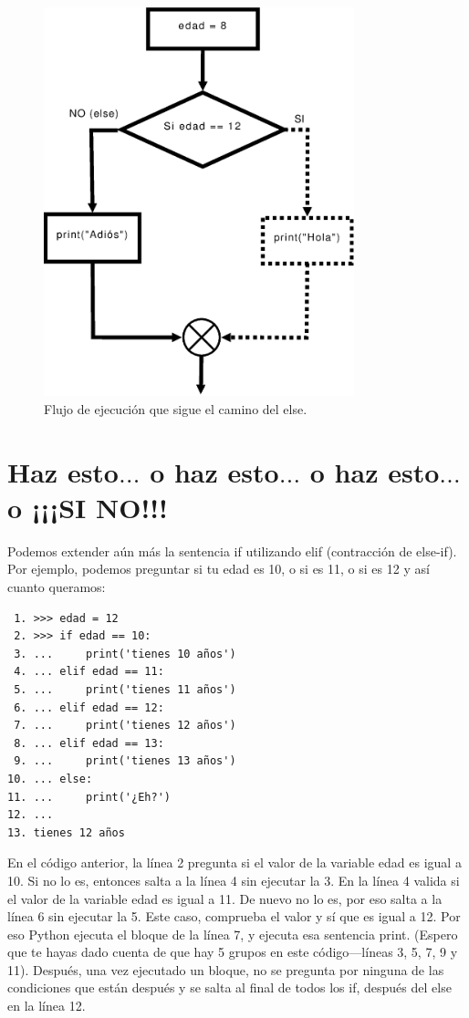 \begin{figure}
\begin{center}
\includegraphics[width=90mm]{if6.eps}
\end{center}
\caption{Flujo de ejecución que sigue el camino del else.}\label{if6}
\end{figure}

\section{Haz esto$\ldots$ o haz esto$\ldots$ o haz esto$\ldots$ o ¡¡¡SI NO!!!}

Podemos extender aún más la sentencia if utilizando elif (contracción de else-if).  Por ejemplo, podemos preguntar si tu edad es 10, o si es 11, o si es 12 y así cuanto queramos: 

\begin{listing}
\begin{verbatim}
 1. >>> edad = 12
 2. >>> if edad == 10:
 3. ...     print('tienes 10 años')
 4. ... elif edad == 11:
 5. ...     print('tienes 11 años')
 6. ... elif edad == 12:
 7. ...     print('tienes 12 años')
 8. ... elif edad == 13:
 9. ...     print('tienes 13 años')
10. ... else:
11. ...     print('¿Eh?')
12. ...
13. tienes 12 años
\end{verbatim}
\end{listing}

En el código anterior, la línea 2 pregunta si el valor de la variable edad es igual a 10.  Si no lo es, entonces salta a la línea 4 sin ejecutar la 3. En la línea 4 valida si el valor de la variable edad es igual a 11. De nuevo no lo es, por eso salta a la línea 6 sin ejecutar la 5.  Este caso, comprueba el valor y sí que es igual a 12.  Por eso Python ejecuta el bloque de la línea 7, y ejecuta esa sentencia print.  (Espero que te hayas dado cuenta de que hay 5 grupos en este código---líneas 3, 5, 7, 9 y 11).  Después, una vez ejecutado un bloque, no se pregunta por ninguna de las condiciones que están después y se salta al final de todos los if, después del else en la línea 12.

